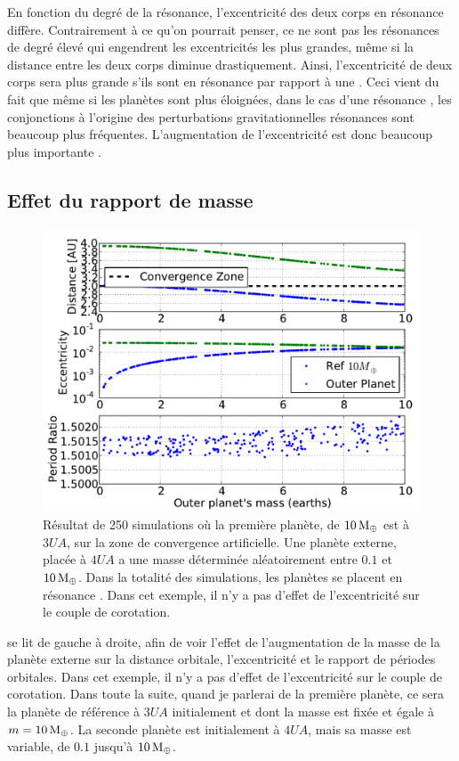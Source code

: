 En fonction du degré de la résonance, l'excentricité des deux corps en résonance diffère. Contrairement à ce qu'on pourrait
penser, ce ne sont pas les résonances de degré élevé qui engendrent les excentricités les plus grandes, même si la distance
entre les deux corps diminue drastiquement. Ainsi, l'excentricité de deux corps sera plus grande s'ils sont en résonance
 par rapport à une . Ceci vient du fait que même si les planètes sont plus éloignées, dans le cas d'une
résonance , les conjonctions à l'origine des perturbations gravitationnelles résonances sont beaucoup plus
fréquentes. L'augmentation de l'excentricité est donc beaucoup plus importante \citep{murray2000solar}. 

\subsection{Effet du rapport de masse}
\begin{figure}[htbp]
\centering
\includegraphics[width=0.75\linewidth]{figure/MMR_mass_ratio.pdf}
\caption[Effet du rapport de masse sur les propriétés d'une résonance.]{Résultat de 250 simulations où la première planète, de
$10\mathrm{\thinspace M_\oplus}$ est à $3\unit{UA}$, sur
la zone de convergence artificielle. Une planète externe, placée à $4\unit{UA}$ a une masse
déterminée aléatoirement entre $0.1$ et $10\mathrm{\thinspace M_\oplus}$. Dans la totalité des simulations, les planètes
se placent en résonance . Dans cet exemple, il n'y a pas d'effet de l'excentricité sur le
couple de corotation.}\label{fig:MMR_mass_ratio}
\end{figure}%

 se lit de gauche à droite, afin de voir l'effet de l'augmentation de la masse de la planète externe
sur la distance orbitale, l'excentricité et le rapport de périodes orbitales. Dans cet exemple, il n'y a pas d'effet de
l'excentricité sur le couple de corotation. Dans toute la suite, quand je parlerai de la première planète, ce sera la planète de référence à $3\unit{UA}$ initialement et dont la masse est fixée et égale à $m=10\mathrm{\thinspace M_\oplus}$. La seconde planète est initialement à $4\unit{UA}$, mais sa masse est variable, de $0.1$ jusqu'à $10\mathrm{\thinspace M_\oplus}$.

